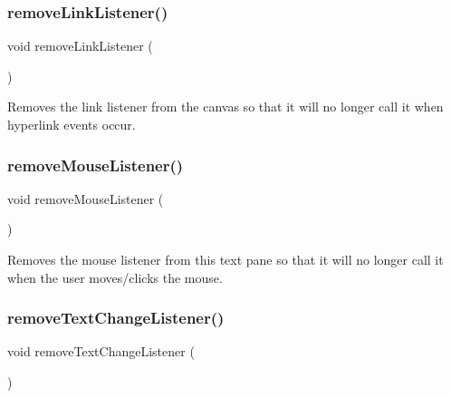 \subsubsection{\texorpdfstring{remove\+Link\+Listener()}{removeLinkListener()}}
{\footnotesize\ttfamily void remove\+Link\+Listener (\begin{DoxyParamCaption}{ }\end{DoxyParamCaption})\hspace{0.3cm}{\ttfamily [virtual]}}



Removes the link listener from the canvas so that it will no longer call it when hyperlink events occur. 

\mbox{\label{classGBrowserPane_aff47f71ce47e688a07c9d38dc92fcc11}} 
\subsubsection{\texorpdfstring{remove\+Mouse\+Listener()}{removeMouseListener()}}
{\footnotesize\ttfamily void remove\+Mouse\+Listener (\begin{DoxyParamCaption}{ }\end{DoxyParamCaption})\hspace{0.3cm}{\ttfamily [virtual]}}



Removes the mouse listener from this text pane so that it will no longer call it when the user moves/clicks the mouse. 

\mbox{\label{classGBrowserPane_a69c940b99d01eb7c353763ce4b0942a4}} 
\subsubsection{\texorpdfstring{remove\+Text\+Change\+Listener()}{removeTextChangeListener()}}
{\footnotesize\ttfamily void remove\+Text\+Change\+Listener (\begin{DoxyParamCaption}{ }\end{DoxyParamCaption})\hspace{0.3cm}{\ttfamily [virtual]}}



